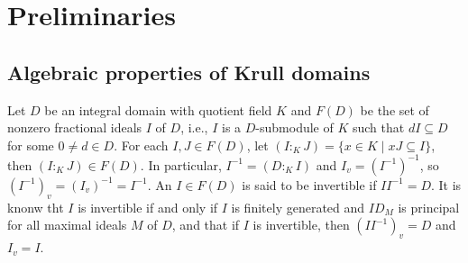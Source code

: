 \documentclass[10pt]{article}
\numberwithin{equation}{section}
\theoremstyle{definition}
\theoremstyle{definition}
\begin{document}

\section{Preliminaries}
\subsection{Algebraic properties of Krull domains}

Let $D$ be an integral domain with quotient field $K$ and $F(D)$ be the set of nonzero fractional ideals $I$ of $D$, i.e., $I$ is a $D$-submodule of $K$ such that $dI \subseteq D$ for some $0 \neq d \in D$.
For each $I, J \in F(D)$, let $(I:_KJ) = \{x \in K \mid xJ \subseteq I\}$,
then $(I:_KJ) \in F(D)$. In particular, $I^{-1} = (D:_KI)$ and $I_v = (I^{-1})^{-1}$, so $(I^{-1})_v = (I_v)^{-1} = I^{-1}$. An $I \in F(D)$ is said to be invertible if $II^{-1} = D$. It is knonw tht $I$ is invertible if and only if $I$ is finitely generated and $ID_M$ is principal for all maximal ideals $M$ of $D$, and that if $I$ is invertible, then $(II^{-1})_v = D$ and $I_v = I$.
\end{document}
